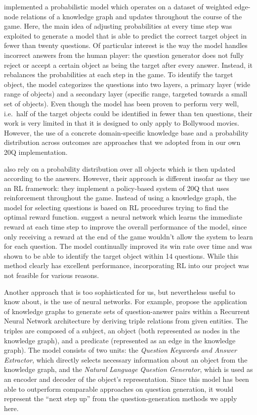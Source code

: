 \documentclass[11pt,a4paper]{article}
\begin{document}
\citet{DeyEa2019} implemented a probabilistic model which operates on a dataset of weighted edge-node relations of a knowledge graph and updates throughout the course of the game. 
Here, the main idea of adjusting probabilities at every time step was exploited to generate a model that is able to predict the correct target object in fewer than twenty questions. 
Of particular interest is the way the model handles incorrect answers from the human player: the question generator does not fully reject or accept a certain object as being the target after every answer. 
Instead, it rebalances the probabilities at each step in the game. 
To identify the target object, the model categorizes the questions into two layers, a primary layer (wide range of objects) and a secondary layer (specific range, targeted towards a small set of objects). 
Even though the model has been proven to perform very well, i.e.\ half of the target objects could be identified in fewer than ten questions, their work is very limited in that it is designed to only apply to Bollywood movies. 
However, the use of a concrete domain-specific knowledge base and a probability distribution across outcomes are approaches that we adopted from \citet{DeyEa2019} in our own 20Q implementation.

\citet{HuEa2018} also rely on a probability distribution over all objects which is then updated according to the answers.
However, their approach is different insofar as they use an RL framework: they implement a policy-based system of 20Q that uses reinforcement throughout the game. 
Instead of using a knowledge graph, the model for selecting questions is based on RL procedures trying to find the optimal reward function. 
\citet{HuEa2018} suggest a neural network which learns the immediate reward at each time step to improve the overall performance of the model, since only receiving a reward at the end of the game wouldn't allow the system to learn for each question.
The model continually improved its win rate over time and was shown to be able to identify the target object within 14 questions.
While this method clearly has excellent performance, incorporating RL into our project was not feasible for various reasons.

Another approach that is too sophisticated for us, but nevertheless useful to know about, is the use of neural networks.
For example, \citet{ReddyEa2017} propose the application of knowledge graphs to generate sets of question-answer pairs within a Recurrent Neural Network architecture by deriving triple relations from given entities. 
The triples are composed of a subject, an object (both represented as nodes in the knowledge graph), and a predicate (represented as an edge in the knowledge graph). 
The model consists of two units: the \textit{Question Keywords and Answer Extractor}, which directly selects necessary information about an object from the knowledge graph, and the \textit{Natural Language Question Generator}, which is used as an encoder and decoder of the object's representation. 
Since this model has been able to outperform comparable approaches on question generation, it would represent the ``next step up'' from the question-generation methods we apply here.
\end{document}

